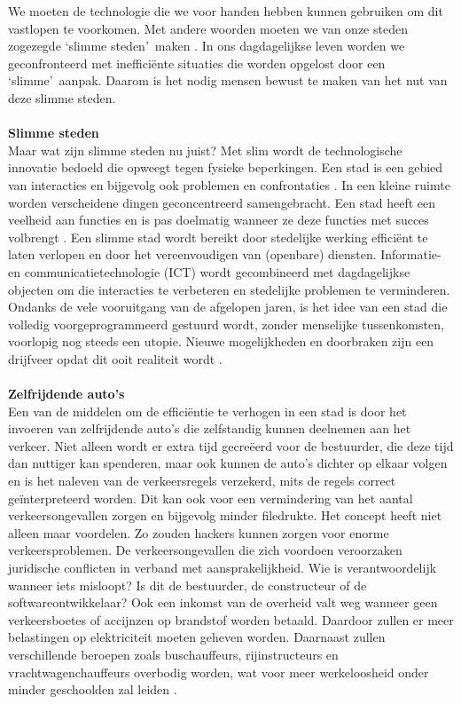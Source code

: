 \documentclass[a4paper,kulak]{kulakarticle}
\begin{document}
We moeten de technologie die we voor handen hebben kunnen gebruiken om dit vastlopen te voorkomen. Met andere woorden moeten we van onze steden zogezegde  \lq slimme steden\rq\  maken \cite{taaladvies}. In ons dagdagelijkse leven worden we geconfronteerd met inefficiënte situaties die worden opgelost door een \lq slimme\rq\ aanpak. Daarom is het nodig mensen bewust te maken van het nut van deze slimme steden.\\ \\
\textbf{\large Slimme steden} \\
Maar wat zijn slimme steden nu juist? Met slim wordt de technologische innovatie bedoeld die opweegt tegen fysieke beperkingen. Een stad is een gebied van interacties en bijgevolg ook problemen en confrontaties \cite{sc}. In een kleine ruimte worden verscheidene dingen geconcentreerd samengebracht. Een stad heeft een veelheid aan functies en is pas doelmatig  wanneer ze deze functies met succes volbrengt \cite{synoniemen}. Een slimme stad wordt bereikt door stedelijke werking efficiënt te laten verlopen en door het vereenvoudigen van (openbare) diensten. Informatie- en communicatietechnologie (ICT) wordt gecombineerd met dagdagelijkse objecten om die interacties te verbeteren en stedelijke problemen te verminderen. Ondanks de vele vooruitgang van de afgelopen jaren, is het idee van een stad die volledig voorgeprogrammeerd gestuurd wordt, zonder menselijke tussenkomsten, voorlopig nog steeds een utopie. Nieuwe mogelijkheden en doorbraken zijn een drijfveer opdat dit ooit realiteit wordt \cite{proconsc}.\\ \\
\textbf{\large Zelfrijdende auto's} \\
Een van de middelen om de efficiëntie te verhogen in een stad is door het invoeren van zelfrijdende auto's die zelfstandig kunnen deelnemen aan het verkeer. Niet alleen wordt er extra tijd gecreëerd voor de bestuurder, die deze tijd dan nuttiger kan spenderen, maar ook kunnen de auto's dichter op elkaar volgen en is het naleven van de verkeersregels verzekerd, mits de regels correct geïnterpreteerd worden. Dit kan ook voor een vermindering van het aantal verkeersongevallen zorgen en bijgevolg minder filedrukte. Het concept heeft niet alleen maar voordelen. Zo zouden hackers kunnen zorgen voor enorme verkeersproblemen. De verkeersongevallen die zich voordoen veroorzaken juridische conflicten in verband met aansprakelijkheid. Wie is verantwoordelijk wanneer iets misloopt? Is dit de bestuurder, de constructeur of de softwareontwikkelaar? Ook een inkomst van de overheid valt weg wanneer geen verkeersboetes of accijnzen op brandstof worden betaald. Daardoor zullen er meer belastingen op elektriciteit moeten geheven worden. Daarnaast zullen verschillende beroepen zoals buschauffeurs, rijinstructeurs en vrachtwagenchauffeurs overbodig worden, wat voor meer werkeloosheid onder minder geschoolden zal leiden \cite{procontracars}.
\end{document}
